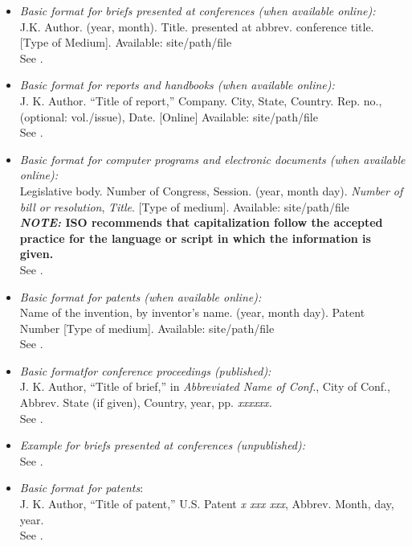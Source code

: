 \documentclass{IEEEtran}
\begin{document}
\begin{itemize}
\item \emph{Basic format for briefs presented at conferences (when available online): }\\
J.K. Author. (year, month). Title. presented at abbrev. conference title. [Type of Medium]. Available: site/path/file\\
See \cite{b17}.

\item \emph{Basic format for reports and handbooks (when available online):}\\
J. K. Author. ``Title of report,'' Company. City, State, Country. Rep. no., (optional: vol./issue), Date. [Online] Available: site/path/file\\
See \cite{b18,b19}.

\item \emph{Basic format for computer programs and electronic documents (when available online): }\\
Legislative body. Number of Congress, Session. (year, month day). \emph{Number of bill or resolution}, \emph{Title}. [Type of medium]. Available: site/path/file\\
\textbf{\emph{NOTE: }ISO recommends that capitalization follow the accepted practice for the language or script in which the information is given.}\\
See \cite{b20}.

\item \emph{Basic format for patents (when available online):}\\
Name of the invention, by inventor's name. (year, month day). Patent Number [Type of medium]. Available: site/path/file\\
See \cite{b21}.

\item \emph{Basic format}\emph{for conference proceedings (published):}\\
J. K. Author, ``Title of brief,'' in \emph{Abbreviated Name of Conf.}, City of Conf., Abbrev. State (if given), Country, year, pp. \emph{xxxxxx.}\\
See \cite{b22}.

\item \emph{Example for briefs presented at conferences (unpublished):}\\
See \cite{b23}.

\item \emph{Basic format for patents}$:$\\
J. K. Author, ``Title of patent,'' U.S. Patent \emph{x xxx xxx}, Abbrev. Month, day, year.\\
See \cite{b24}.


\end{itemize}
\end{document}
